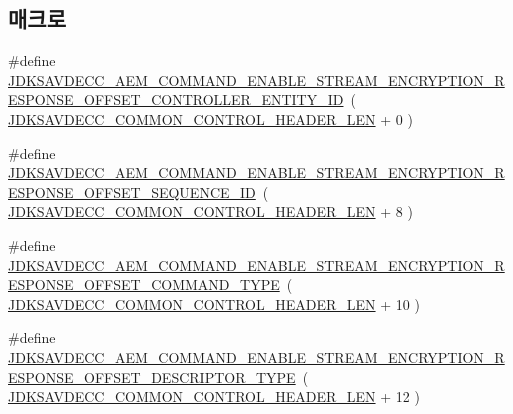 \subsection*{매크로}
\begin{DoxyCompactItemize}
\item 
\#define \hyperlink{group__command__enable__stream__encryption__response_gad6cefb68c89b76fadc05d8950ae052da}{J\+D\+K\+S\+A\+V\+D\+E\+C\+C\+\_\+\+A\+E\+M\+\_\+\+C\+O\+M\+M\+A\+N\+D\+\_\+\+E\+N\+A\+B\+L\+E\+\_\+\+S\+T\+R\+E\+A\+M\+\_\+\+E\+N\+C\+R\+Y\+P\+T\+I\+O\+N\+\_\+\+R\+E\+S\+P\+O\+N\+S\+E\+\_\+\+O\+F\+F\+S\+E\+T\+\_\+\+C\+O\+N\+T\+R\+O\+L\+L\+E\+R\+\_\+\+E\+N\+T\+I\+T\+Y\+\_\+\+ID}~( \hyperlink{group__jdksavdecc__avtp__common__control__header_gaae84052886fb1bb42f3bc5f85b741dff}{J\+D\+K\+S\+A\+V\+D\+E\+C\+C\+\_\+\+C\+O\+M\+M\+O\+N\+\_\+\+C\+O\+N\+T\+R\+O\+L\+\_\+\+H\+E\+A\+D\+E\+R\+\_\+\+L\+EN} + 0 )
\item 
\#define \hyperlink{group__command__enable__stream__encryption__response_gaa4031072df708111656957942c36913b}{J\+D\+K\+S\+A\+V\+D\+E\+C\+C\+\_\+\+A\+E\+M\+\_\+\+C\+O\+M\+M\+A\+N\+D\+\_\+\+E\+N\+A\+B\+L\+E\+\_\+\+S\+T\+R\+E\+A\+M\+\_\+\+E\+N\+C\+R\+Y\+P\+T\+I\+O\+N\+\_\+\+R\+E\+S\+P\+O\+N\+S\+E\+\_\+\+O\+F\+F\+S\+E\+T\+\_\+\+S\+E\+Q\+U\+E\+N\+C\+E\+\_\+\+ID}~( \hyperlink{group__jdksavdecc__avtp__common__control__header_gaae84052886fb1bb42f3bc5f85b741dff}{J\+D\+K\+S\+A\+V\+D\+E\+C\+C\+\_\+\+C\+O\+M\+M\+O\+N\+\_\+\+C\+O\+N\+T\+R\+O\+L\+\_\+\+H\+E\+A\+D\+E\+R\+\_\+\+L\+EN} + 8 )
\item 
\#define \hyperlink{group__command__enable__stream__encryption__response_ga2ff24a965ba3889448bba5793b9b9490}{J\+D\+K\+S\+A\+V\+D\+E\+C\+C\+\_\+\+A\+E\+M\+\_\+\+C\+O\+M\+M\+A\+N\+D\+\_\+\+E\+N\+A\+B\+L\+E\+\_\+\+S\+T\+R\+E\+A\+M\+\_\+\+E\+N\+C\+R\+Y\+P\+T\+I\+O\+N\+\_\+\+R\+E\+S\+P\+O\+N\+S\+E\+\_\+\+O\+F\+F\+S\+E\+T\+\_\+\+C\+O\+M\+M\+A\+N\+D\+\_\+\+T\+Y\+PE}~( \hyperlink{group__jdksavdecc__avtp__common__control__header_gaae84052886fb1bb42f3bc5f85b741dff}{J\+D\+K\+S\+A\+V\+D\+E\+C\+C\+\_\+\+C\+O\+M\+M\+O\+N\+\_\+\+C\+O\+N\+T\+R\+O\+L\+\_\+\+H\+E\+A\+D\+E\+R\+\_\+\+L\+EN} + 10 )
\item 
\#define \hyperlink{group__command__enable__stream__encryption__response_gaa8748d3869839a590e7974a68d32981d}{J\+D\+K\+S\+A\+V\+D\+E\+C\+C\+\_\+\+A\+E\+M\+\_\+\+C\+O\+M\+M\+A\+N\+D\+\_\+\+E\+N\+A\+B\+L\+E\+\_\+\+S\+T\+R\+E\+A\+M\+\_\+\+E\+N\+C\+R\+Y\+P\+T\+I\+O\+N\+\_\+\+R\+E\+S\+P\+O\+N\+S\+E\+\_\+\+O\+F\+F\+S\+E\+T\+\_\+\+D\+E\+S\+C\+R\+I\+P\+T\+O\+R\+\_\+\+T\+Y\+PE}~( \hyperlink{group__jdksavdecc__avtp__common__control__header_gaae84052886fb1bb42f3bc5f85b741dff}{J\+D\+K\+S\+A\+V\+D\+E\+C\+C\+\_\+\+C\+O\+M\+M\+O\+N\+\_\+\+C\+O\+N\+T\+R\+O\+L\+\_\+\+H\+E\+A\+D\+E\+R\+\_\+\+L\+EN} + 12 )

\end{DoxyCompactItemize}

